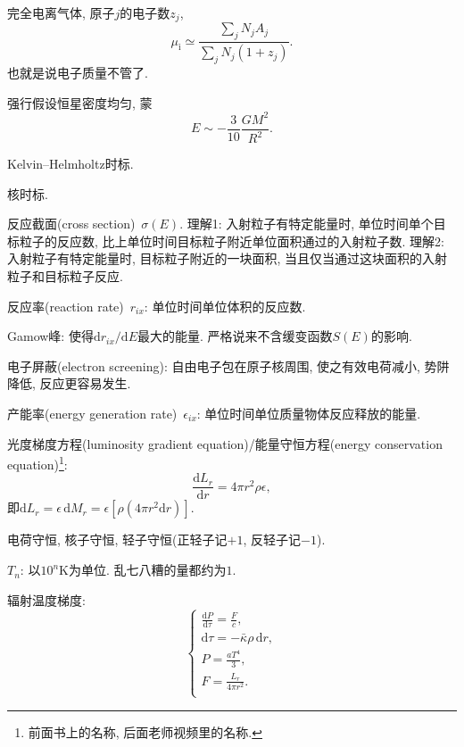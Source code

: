 完全电离气体, 原子$j$的电子数$z_j$,
\begin{equation*}
    \mu_\text{i}\simeq\frac{\sum_j N_j A_j}{\sum_j N_j(1+z_j)}.
\end{equation*}
也就是说电子质量不管了.

强行假设恒星密度均匀, 蒙
\begin{equation*}
    E\sim-\frac{3}{10}\frac{GM^2}{R^2}.
\end{equation*}

Kelvin--Helmholtz时标.

核时标.

反应截面(cross section)~$\sigma(E)$. 理解1: 入射粒子有特定能量时, 单位时间单个目标粒子的反应数, 比上单位时间目标粒子附近单位面积通过的入射粒子数. 理解2: 入射粒子有特定能量时, 目标粒子附近的一块面积, 当且仅当通过这块面积的入射粒子和目标粒子反应.

反应率(reaction rate)~$r_{ix}$: 单位时间单位体积的反应数.

Gamow峰: 使得$\mathrm{d}r_{ix}/\mathrm{d}E$最大的能量. 严格说来不含缓变函数$S(E)$的影响.

电子屏蔽(electron screening): 自由电子包在原子核周围, 使之有效电荷减小, 势阱降低, 反应更容易发生.

产能率(energy generation rate)~$\epsilon_{ix}$: 单位时间单位质量物体反应释放的能量.

光度梯度方程(luminosity gradient equation)/能量守恒方程(energy conservation equation)\footnote{前面书上的名称, 后面老师视频里的名称.}:
\begin{equation*}
    \frac{\mathrm{d} L_r}{\mathrm{d} r}
    = 4\pi r^2\rho\epsilon,
\end{equation*}
即$\mathrm{d} L_r = \epsilon\,\mathrm{d} M_r= \epsilon[\rho(4\pi r^2\mathrm{d} r)]$.

电荷守恒, 核子守恒, 轻子守恒(正轻子记$+1$, 反轻子记$-1$).

$T_n$: 以$10^n\text{K}$为单位. 乱七八糟的量都约为$1$.

辐射温度梯度:
\begin{equation*}
    \begin{cases}
        \frac{\mathrm{d}P}{\mathrm{d}\tau}=\frac{F}{c}, \\
        \mathrm{d}\tau = -\bar{\kappa}\rho\,\mathrm{d}r, \\
         P=\frac{aT^4}{3}, \\
         F=\frac{L_r}{4\pi r^2}. \\
    \end{cases}
\end{equation*}

